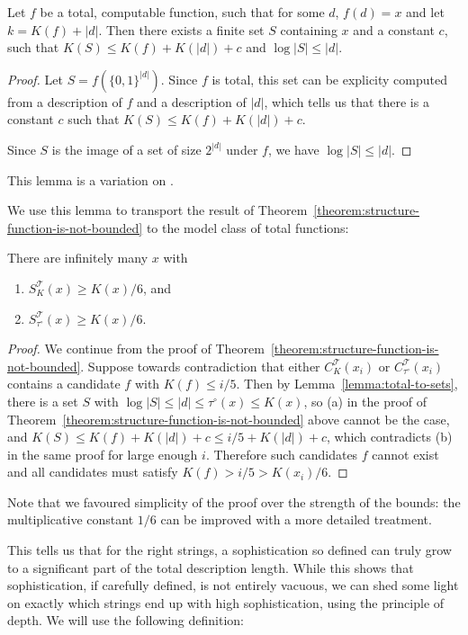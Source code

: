 \documentclass{style/llncs}
\newcommand{\T}{\mathscr T}
\begin{document}
\begin{lemma}
Let $f$ be a total, computable function, such that for some $d$, $f(d) = x$ and let $k = K(f) + |d|$. Then there exists a finite set $S$ containing $x$ and a constant $c$, such that $K(S) \leq K(f) + K(|d|) + c$ and $\log |S| \leq |d|$.\label{lemma:total-to-sets}
\end{lemma}
\begin{proof}
Let $S = f\left(\{0,1\}^{|d|}\right)$. Since $f$ is total, this set can be explicity computed from a description of $f$ and a description of $|d|$, which tells us that there is a constant $c$ such that $K(S) \leq K(f) + K(|d|) + c$. 

Since $S$ is the image of a set of size $2^{|d|}$ under $f$, we have $\log |S| \leq |d|$.
\end{proof}
This lemma is a variation on \cite[Lemma~7.2]{vitanyi2004meaningful}.

We use this lemma to transport the result of Theorem~\ref{theorem:structure-function-is-not-bounded} to the model class of total functions:

\begin{theorem}
There are infinitely many $x$ with 
\begin{enumerate}
  \item $S^\T_K(x) \geq K(x)/6$, {and}\label{eq:poezenvoer}
  \item $S^\T_{\tau^\circ}(x) \geq K(x)/6$. \label{eq:hondevoer}
\end{enumerate}
\end{theorem}
\begin{proof}
We continue from the proof of Theorem~\ref{theorem:structure-function-is-not-bounded}. Suppose towards contradiction that either $C^\T_K(x_i)$ or $C^\T_{\tau^\circ}(x_i)$ contains a candidate $f$ with $K(f)\le i/5$. Then by Lemma~\ref{lemma:total-to-sets}, there is a set $S$ with $\log|S|\le|d|\le\tau^\circ(x)\le K(x)$, so (a) in the proof of Theorem~\ref{theorem:structure-function-is-not-bounded} above cannot be the case, and $K(S)\le K(f)+K(|d|)+c\le i/5+K(|d|)+c$, which contradicts (b) in the same proof for large enough $i$. Therefore such candidates $f$ cannot exist and all candidates must satisfy $K(f)>i/5>K(x_i)/6$.
\end{proof}
Note that we favoured simplicity of the proof over the strength of the bounds: the multiplicative constant $1/6$ can be improved with a more detailed treatment.

This tells us that for the right strings, a sophistication so defined can truly grow to a significant part of the total description length. While this shows that sophistication, if carefully defined, is not entirely vacuous, we can shed some light on exactly which strings end up with high sophistication, using the principle of depth. We will use the following definition:
\end{document}
